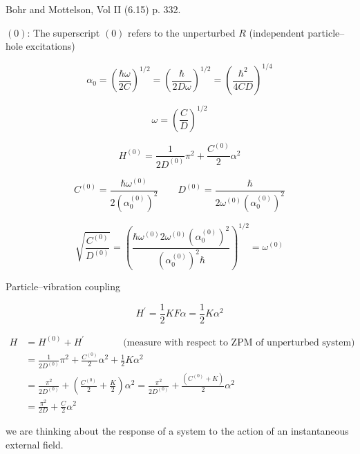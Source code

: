 \documentclass[a4paper,onecolumn,superscriptaddress,12pt,nofootinbib,twoside,raggedfooter,notitlepage]{revtex4-1}
\begin{document}
Bohr and Mottelson, Vol II (6.15) p. 332.

$(0)$: The superscript $(0)$ refers to the unperturbed $R$ (independent particle--hole excitations)

$$ \alpha_0 = \left( \frac{\hbar \omega}{2C} \right)^{1/2} = \left( \frac{\hbar}{2D \omega} \right)^{1/2} = \left( \frac{\hbar^2}{4CD} \right)^{1/4} $$

$$ \omega = \left( \frac{C}{D} \right)^{1/2} $$

$$ H^{(0)} = \frac{1}{2D^{(0)}} \pi^2 + \frac{C^{(0)}}{2} \alpha^2 $$

$$ C^{(0)} = \frac{\hbar \omega^{(0)}}{2 \left( \alpha_0^{(0)} \right)^2} \qquad D^{(0)} = \frac{\hbar}{2 \omega^{(0)} \left( \alpha_0^{(0)} \right)^2} $$

$$ \sqrt{\frac{C^{(0)}}{D^{(0)}}} = \left( \frac{\hbar \omega^{(0)} 2 \omega^{(0)} \left( \alpha_0^{(0)} \right)^2}{\left( \alpha_0^{(0)} \right)^2 \hbar} \right)^{1/2} = \omega^{(0)} $$

Particle--vibration coupling

$$ H^\prime = \frac{1}{2} K F \alpha = \frac{1}{2} K \alpha^2 $$

\vspace{-0.8cm}

\begin{align*}
	H &= H^{(0)} + H^\prime \qquad \qquad \textrm{(measure with respect to ZPM of unperturbed system)} \\
	&= \frac{1}{2D^{(0)}} \pi^2 + \frac{C^{(0)}}{2} \alpha^2 + \frac{1}{2} K \alpha^2 \\
	&= \frac{\pi^2}{2D^{(0)}} + \left( \frac{C^{(0)}}{2} + \frac{K}{2} \right) \alpha^2 = \frac{\pi^2}{2D^{(0)}} + \frac{\left( C^{(0)} + K \right)}{2} \alpha^2 \\
	&= \frac{\pi^2}{2D} + \frac{C}{2} \alpha^2
\end{align*}


we are thinking about the response of a system to the action of an instantaneous external field.

\vspace{2cm}
\end{document}
